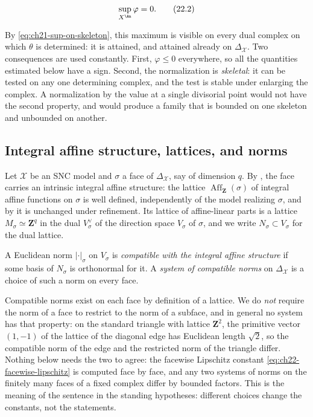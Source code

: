 \[
                         \sup_{X^{\An}}\varphi=0.
\tag{22.2}\label{eq:ch22-normalization}
\]

By \eqref{eq:ch21-sup-on-skeleton}, this maximum is visible on every dual
complex on which $\theta$ is determined: it is attained, and attained
already on $\Delta_{\mathcal X}$.  Two consequences are used constantly.
First, $\varphi\leq0$ everywhere, so all the quantities estimated below
have a sign.  Second, the normalization is \emph{skeletal}: it can be tested
on any one determining complex, and the test is stable under enlarging the
complex.  A normalization by the value at a single divisorial point would
not have the second property, and would produce a family that is bounded on
one skeleton and unbounded on another.

\subsection{Integral affine structure, lattices, and norms}

Let $\mathcal X$ be an SNC model and $\sigma$ a face of
$\Delta_{\mathcal X}$, say of dimension $q$.  By
, the face carries
an intrinsic integral affine structure: the lattice
$\operatorname{Aff}_{\mathbf Z}(\sigma)$ of integral affine functions on
$\sigma$ is well defined, independently of the model realizing
$\sigma$, and by  it is unchanged
under refinement.  Its lattice of affine-linear parts is a lattice
$M_\sigma\simeq\mathbf Z^q$ in the dual $V_\sigma^\vee$ of the direction
space $V_\sigma$ of $\sigma$, and we write
$N_\sigma\subset V_\sigma$ for the dual lattice.

\begin{definition}
\label{def:ch22-compatible-norm}
A Euclidean norm $|\cdot|_\sigma$ on $V_\sigma$ is \emph{compatible with
the integral affine structure} if some basis of $N_\sigma$ is orthonormal
for it.  A \emph{system of compatible norms} on $\Delta_{\mathcal X}$ is a
choice of such a norm on every face.
\end{definition}

Compatible norms exist on each face by definition of a lattice.  We do
\emph{not} require the norm of a face to restrict to the norm of a subface,
and in general no system has that property: on the standard triangle with
lattice $\mathbf Z^2$, the primitive vector $(1,-1)$ of the lattice of
the diagonal edge has Euclidean length $\sqrt2$, so the compatible norm of
the edge and the restricted norm of the triangle differ.  Nothing below
needs the two to agree: the facewise Lipschitz constant
\eqref{eq:ch22-facewise-lipschitz} is computed face by face, and any two
systems of norms on the finitely many faces of a fixed complex differ by
bounded factors.  This is the meaning of the sentence in the standing
hypotheses: different choices change the constants, not the statements.

